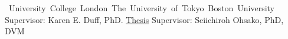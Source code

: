 %
%
%


\begin{cventries}

    {\vspace*{-0.45cm}\mbox{\hspace{-0.35mm} University College London
        \hspace{21.45mm} The University of Tokyo
        \hspace{25.25mm} Boston University}}
    {}
    {}
    {\hspace{-0mm} {\small{Supervisor: Karen E. Duff, PhD. \href{https://eturkes.com/media/phd-thesis/}{Thesis}}}
        \hspace{15.15mm} {\small{Supervisor: Seiichiroh Ohsako, PhD, DVM}}}

\end{cventries}

\vspace*{-0.2cm}
